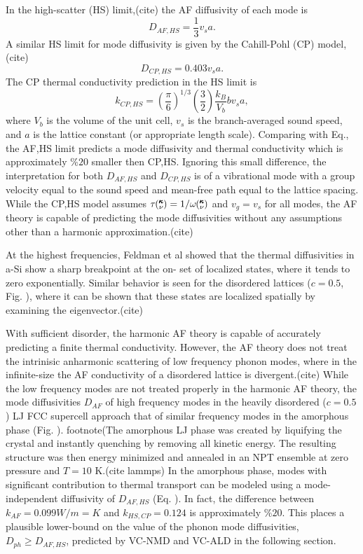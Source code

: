 \documentclass[aps,prb,onecolumn,preprint,superscriptaddress,amsmath,amssymb,floatfix]{revtex4}
\newcommand{\kv}{\mspace{-4.0mu}\left(\mspace{-8.0mu}
\begin{smallmatrix}&\pmb{\kappa} \\&\nu\end{smallmatrix}
\mspace{-3.0mu}\right)}
\begin{document}
In the high-scatter (HS) limit,(cite) the AF diffusivity of each mode is
\begin{equation}\label{EQ:M:k_HS}
D_{AF,HS} = \frac{1}{3} v_s a.
\end{equation}
A similar HS limit for mode diffusivity 
is given by the Cahill-Pohl (CP) model,(cite)  
\begin{equation}\label{EQ:M:k_HS}
D_{CP,HS} = 0.403 v_s a.
\end{equation}
The CP thermal conductivity prediction in the HS limit is
\begin{equation}\label{EQ:M:k_HS}
k_{CP,HS} = (\frac{\pi}{6})^{1/3} (\frac{3}{2}) \frac{k_{B}}{V_b}b v_s a,
\end{equation}
where $V_b$ is the volume of the unit cell, $v_s$ is the 
branch-averaged sound speed, and $a$ is the lattice constant 
(or appropriate length scale).\cite{cahill_lattice_1988} 
Comparing with Eq., the AF,HS limit predicts a mode diffusivity and 
thermal conductivity which is approximately $\%20$ smaller then 
CP,HS.\cite{cahill_lattice_1988} 
Ignoring this small difference, 
the interpretation for both $D_{AF,HS}$ and $D_{CP,HS}$ is of a vibrational 
mode with a group velocity equal to the sound speed 
and mean-free path equal to the 
lattice spacing. 
While the CP,HS model assumes $\tau\kv = 1/\omega\kv$ 
and $v_g = v_s$ for all modes, the AF theory is capable 
of predicting the mode diffusivities without 
any assumptions other than a harmonic approximation.(cite)

At the highest frequencies, Feldman et al showed that the thermal 
diffusivities in a-Si show a sharp breakpoint at the on-
set of localized states, where it tends to zero exponentially. 
Similar behavior is seen for the disordered lattices 
($c=0.5$, Fig. ), where it can be shown that these states are 
localized spatially by examining the eigenvector.(cite) 


With sufficient disorder, the 
harmonic AF theory is capable of accurately predicting a finite 
thermal conductivity.
\cite{feldman_thermal_1993,shenogin_predicting_2009} 
However, the AF theory does not 
treat the intrinisic anharmonic scattering of low frequency 
phonon modes, where in the infinite-size   
the AF conductivity of a disordered lattice is divergent.(cite)   
While the low frequency modes are not treated properly in the harmonic 
AF theory, the mode diffusivities 
$D_{AF}$ of high frequency modes in the heavily disordered ($c=0.5$) LJ 
FCC supercell approach that of similar frequency modes in the 
amorphous phase 
(Fig. ).
footnote(The amorphous LJ phase was created by liquifying the crystal 
and instantly quenching by removing all kinetic energy.  The resulting 
structure was then energy minimized and annealed in an NPT ensemble at 
zero pressure and $T=10$ K.(cite lammps)
In the amorphous phase, modes with significant 
contribution to thermal transport can be modeled using a mode-independent 
diffusivity of $D_{AF,HS}$ (Eq. ). In fact, the difference between  
$k_{AF} = 0.099 W/m=K$ and $k_{HS,CP} = 0.124$ is approximately 
$\%20$. 
This places a plausible lower-bound on the value of the phonon mode 
diffusivities, $D_{ph} \ge D_{AF,HS}$, predicted by VC-NMD and VC-ALD in 
the following section.
\end{document}
